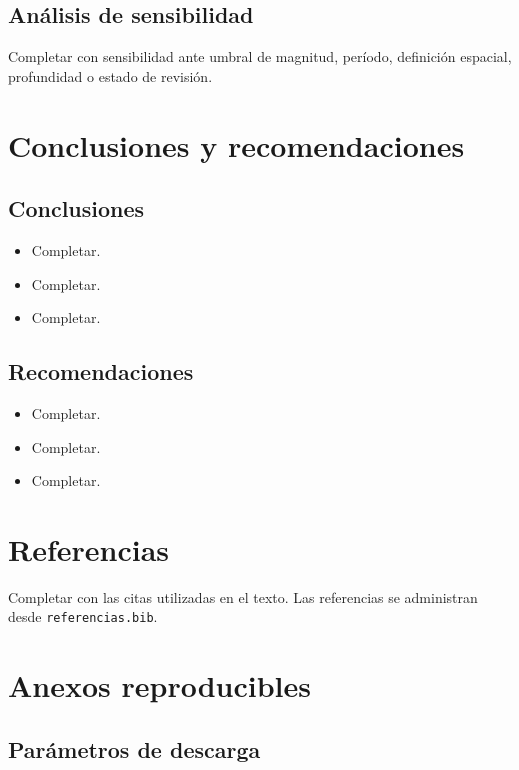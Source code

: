 \documentclass[
  spanish,
  letterpaper,
  DIV=11,
  numbers=noendperiod]{scrartcl}
\providecommand{\tightlist}{%
  \setlength{\itemsep}{0pt}\setlength{\parskip}{0pt}}
\begin{document}
\subsection{Análisis de sensibilidad}\label{anuxe1lisis-de-sensibilidad}

Completar con sensibilidad ante umbral de magnitud, período, definición
espacial, profundidad o estado de revisión.

\section{Conclusiones y
recomendaciones}\label{conclusiones-y-recomendaciones}

\subsection{Conclusiones}\label{conclusiones}

\begin{itemize}
\tightlist
\item
  Completar.
\item
  Completar.
\item
  Completar.
\end{itemize}

\subsection{Recomendaciones}\label{recomendaciones}

\begin{itemize}
\tightlist
\item
  Completar.
\item
  Completar.
\item
  Completar.
\end{itemize}

\section{Referencias}\label{referencias}

Completar con las citas utilizadas en el texto. Las referencias se
administran desde \texttt{referencias.bib}.

\section{Anexos reproducibles}\label{anexos-reproducibles}

\subsection{Parámetros de descarga}\label{paruxe1metros-de-descarga-1}
\end{document}

